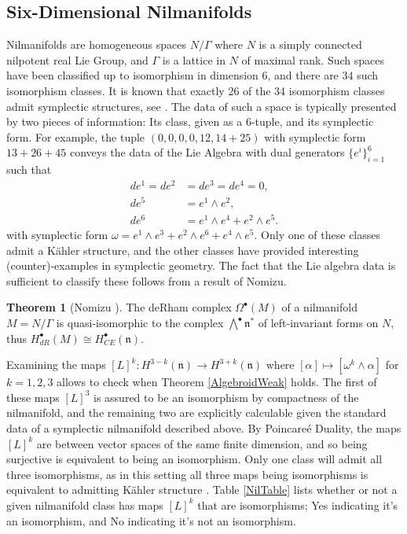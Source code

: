 \documentclass{amsart}
\newcommand{\ra}{\rightarrow}
\theoremstyle{definition}
\newtheorem*{theorem*}{Theorem}
\begin{document}
 
\subsection{Six-Dimensional Nilmanifolds}
Nilmanifolds are homogeneous spaces $N/\Gamma$ where $N$ is a simply connected nilpotent real Lie Group, and $\Gamma$ is a lattice in $N$ of maximal rank. Such spaces have been classified up to isomorphism in dimension $6$, and there are $34$ such isomorphism classes. It is known that exactly 26 of the 34 isomorphism classes admit symplectic structures, see \cite{NilpLieAlg}. The data of such a space is typically presented by two pieces of information: Its class, given as a $6$-tuple, and its symplectic form. For example, the tuple $(0,0,0,0,12,14+25)$ with symplectic form $13+26+45$ conveys the data of the Lie Algebra with dual generators $\{e^i\}_{i=1}^6$ such that
\begin{align*}
    de^1 = de^2&=de^3=de^4=0, \\
    de^5 &= e^1 \wedge e^2, \\
    de^6 &= e^1\wedge e^4 + e^2 \wedge e^5.
\end{align*}
with symplectic form $\omega = e^1 \wedge e^3 + e^2 \wedge e^6 + e^4 \wedge e^5$. Only one of these classes admit a K\"ahler structure, and the other classes have provided interesting (counter)-examples in symplectic geometry. The fact that the Lie algebra data is sufficient to classify these follows from a result of Nomizu.
\begin{theorem*}[Nomizu \cite{MR64057}]
   The deRham complex $\Omega^\bullet(M)$ of a nilmanifold $M=N/\Gamma$ is quasi-isomorphic to the complex $\bigwedge^\bullet \mathfrak{n}^*$ of left-invariant forms on $N$, thus $H_{dR}^\bullet(M) \cong H_{CE}^\bullet(\mathfrak{n})$.
\end{theorem*}
Examining the maps $[L]^k:H^{3-k}(\mathfrak{n}) \ra H^{3+k}(\mathfrak{n})$ where $[\alpha] \mapsto [\omega^k \wedge \alpha ]$ for $k=1,2,3$ allows to check when Theorem \ref{AlgebroidWeak} holds.
The first of these maps $[L]^3$ is assured to be an isomorphism by compactness of the nilmanifold, and the remaining two are explicitly calculable given the standard data of a symplectic nilmanifold described above. By Poincare\'e Duality, the maps $[L]^k$ are between vector spaces of the same finite dimension, and so being surjective is equivalent to being an isomorphism. Only one class will admit all three isomorphisms, as in this setting all three maps being isomorphisms is equivalent to admitting K\"ahler structure \cite{MR993739}. Table \ref{NilTable} lists whether or not a given nilmanifold class has maps $[L]^k$ that are isomorphisms; Yes indicating it's an isomorphism, and No indicating it's not an isomorphism.
\end{document}
